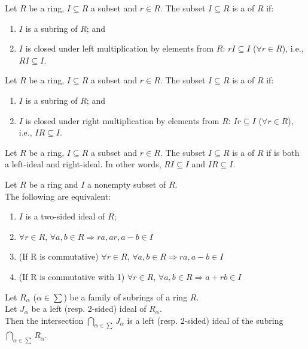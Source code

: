 \begin{definition}
Let $R$ be a ring, $I \subseteq R$ a subset and $r \in R$. The subset $I \subseteq R$ is a  of $R$ if:
\begin{enumerate}[label=(\roman*)]
\item $I$ is a subring of $R$; and
\item $I$ is closed under left multiplication by elements from $R$: $rI \subseteq I$ ($\forall r \in R$), i.e., $RI \subseteq I$.
\end{enumerate}
\end{definition}


\begin{definition}
Let $R$ be a ring, $I \subseteq R$ a subset and $r \in R$. The subset $I \subseteq R$ is a  of $R$ if:
\begin{enumerate}[label=(\roman*)]
\item $I$ is a subring of $R$; and
\item $I$ is closed under right multiplication by elements from $R$: $Ir \subseteq I$ ($\forall r \in R$), i.e., $IR \subseteq I$.
\end{enumerate}
\end{definition}


\begin{definition}
Let $R$ be a ring, $I \subseteq R$ a subset and $r \in R$. The subset $I \subseteq R$ is a  of $R$ if is both a left-ideal and right-ideal. In other words, $RI \subseteq I$ and $IR \subseteq I$.
\end{definition}


\begin{proposition}
 Let $R$ be a ring and $I$ a nonempty subset of $R$.\\
The following are equivalent:
\begin{enumerate}[label=(\roman*)]
\item $I$ is a two-sided ideal of $R$;
\item $\forall r \in R$, $\forall a, b \in R \Rightarrow ra, ar, a-b \in I$
\item (If R is commutative) $\forall r \in R$, $\forall a, b \in R \Rightarrow ra, a-b \in I$
\item (If R is commutative with 1) $\forall r \in R$, $\forall a, b \in R \Rightarrow a+rb \in I$
\end{enumerate}
\end{proposition}


\begin{proposition}
Let $R_\alpha$ ($\alpha \in \sum$) be a family of subrings of a ring $R$.\\
Let $J_\alpha$ be a left (resp. 2-sided) ideal of $R_\alpha$.\\
Then the intersection $\bigcap\limits_{\alpha \in \sum}J_\alpha$ is a left (resp. 2-sided) ideal of the subring $\bigcap\limits_{\alpha \in \sum}R_\alpha$.\\
\end{proposition}


